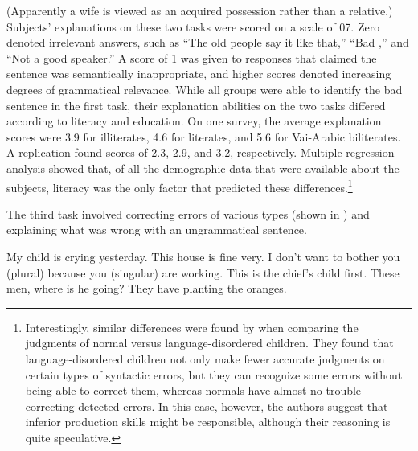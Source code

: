     \z

\noindent
(Apparently a wife is viewed as an acquired possession rather than a relative.) Subjects' explanations on these two tasks were scored on a scale of 0\textendash{}7. Zero denoted irrelevant answers, such as ``The old people say it like that,'' ``Bad ,'' and ``Not a good  speaker.'' A score of 1 was given to responses that claimed the sentence was semantically inappropriate, and higher scores denoted increasing degrees of grammatical relevance. While all groups were able to identify the bad sentence in the first task, their explanation abilities on the two tasks differed according to literacy and education. On one survey, the average explanation scores were 3.9 for illiterates, 4.6 for  literates, and 5.6 for Vai-Arabic biliterates. A replication found scores of 2.3, 2.9, and 3.2, respectively. Multiple regression analysis showed that, of all the demographic data that were available about the subjects,  literacy was the only factor that predicted these differences.\footnote{Interestingly, similar differences were found by \citet{LilesEtAl1977} when comparing the judgments of normal versus language-disordered children. They found that language-disordered children not only make fewer accurate judgments on certain types of syntactic errors, but they can recognize some errors without being able to correct them, whereas normals have almost no trouble correcting detected errors. In this case, however, the authors suggest that inferior production skills might be responsible, although their reasoning is quite speculative.}


The third task involved correcting errors of various types (shown in ) and explaining what was wrong with an ungrammatical sentence.

\ea\label{ex:4:8}
\ea My child is crying yesterday.
\ex This house is fine very.
\ex I don't want to bother you (plural) because you (singular) are working.
\ex This is the chief's child first.
\ex These men, where is he going?
\ex They have planting the oranges.
\z
\z

